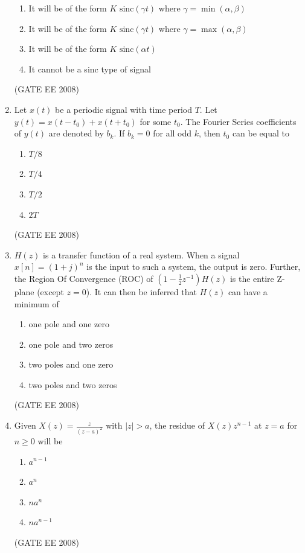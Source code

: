 \documentclass[journal,12pt,onecolumn]{IEEEtran}
\theoremstyle{remark}
\begin{document}
\begin{enumerate}[start=1, label=Q.\arabic*]
\begin{enumerate}
    \item It will be of the form $K \text{ sinc}(\gamma t)$ where $\gamma=\min(\alpha, \beta)$
    \item It will be of the form $K \text{ sinc}(\gamma t)$ where $\gamma=\max(\alpha, \beta)$
    \item It will be of the form $K \text{ sinc}(\alpha t)$
    \item It cannot be a sinc type of signal
\end{enumerate}
\hfill (GATE EE 2008)

\item Let $x(t)$ be a periodic signal with time period $T$. Let $y(t) = x(t-t_0)+x(t+t_0)$ for some $t_0$. The Fourier Series coefficients of $y(t)$ are denoted by $b_k$. If $b_k=0$ for all odd $k$, then $t_0$ can be equal to

\begin{multicols}{4}
\begin{enumerate}
    \item $T/8$
    \item $T/4$
    \item $T/2$
    \item $2T$
\end{enumerate}
\end{multicols}
\hfill (GATE EE 2008)


\item $H(z)$ is a transfer function of a real system. When a signal $x[n] = (1+j)^{n}$ is the input to such a system, the output is zero. Further, the Region Of Convergence (ROC) of $\left(1-\frac{1}{2}z^{-1}\right) H(z)$ is the entire Z-plane (except $z=0$). It can then be inferred that $H(z)$ can have a minimum of

\begin{enumerate}
    \item one pole and one zero
    \item one pole and two zeros
    \item two poles and one zero
    \item two poles and two zeros
\end{enumerate}
\hfill (GATE EE 2008)


\item Given $X(z)=\frac{z}{(z-a)^2}$ with $|z|>a$, the residue of $X(z)z^{n-1}$ at $z=a$ for $n \ge 0$ will be

\begin{multicols}{4}
\begin{enumerate}[label=(\Alph*)]
    \item $a^{n-1}$
    \item $a^{n}$
    \item $na^{n}$
    \item $na^{n-1}$
\end{enumerate}
\end{multicols}
\hfill (GATE EE 2008)



\end{enumerate}
\end{document}
